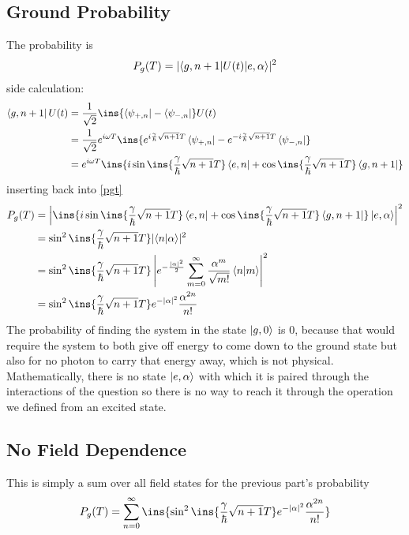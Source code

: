 \subsection{Ground Probability}
The probability is
\begin{equation}\label{pgt}
    P_g(T) = \lvert \braket{g,n+1\vert U(t)\vert e,\alpha} \rvert^2
\end{equation}
side calculation:
\begin{align}
    \bra{g,n+1}U(t) &= \frac{1}{\sqrt{2}}\ins{\bra{\psi_{+,n}}-\bra{\psi_{-,n}}}U(t)\\
    &= \frac{1}{\sqrt{2}}e^{i\omega T}\ins{e^{i\frac{\gamma}{\hbar}\sqrt{n+1}T}\bra{\psi_{+,n}}-e^{-i\frac{\gamma}{\hbar}\sqrt{n+1}T}\bra{\psi_{-,n}}}\\
    &= e^{i\omega T}\ins{i\sin\ins{\frac{\gamma}{\hbar}\sqrt{n+1}T}\bra{e,n}+\cos\ins{\frac{\gamma}{\hbar}\sqrt{n+1}T}\bra{g,n+1}}
\end{align}
inserting back into \autoref{pgt}
\begin{align}
    P_g(T) &= \left\lvert \ins{i\sin\ins{\frac{\gamma}{\hbar}\sqrt{n+1}T}\bra{e,n}+\cos\ins{\frac{\gamma}{\hbar}\sqrt{n+1}T}\bra{g,n+1}}\ket{e,\alpha} \right\rvert^2\\
    &= \sin^2\ins{\frac{\gamma}{\hbar}\sqrt{n+1}T}\lvert\braket{n\vert\alpha}\rvert^2\\
    &= \sin^2\ins{\frac{\gamma}{\hbar}\sqrt{n+1}T}\left\lvert e^{-\frac{\lvert\alpha\rvert^2}{2}}\sum\limits_{m=0}^\infty\frac{\alpha^m}{\sqrt{m!}}\braket{n\vert m}\right\rvert^2\\
    &= \sin^2\ins{\frac{\gamma}{\hbar}\sqrt{n+1}T}e^{-\lvert\alpha\rvert^2}\frac{\alpha^{2n}}{n!}
\end{align}
The probability of finding the system in the state $\ket{g,0}$ is 0, because that would require the system to both give off energy to come down to the ground state but also for no photon to carry that energy away, which is not physical. Mathematically, there is no state $\ket{e,\alpha}$ with which it is paired through the interactions of the question so there is no way to reach it through the operation we defined from an excited state.
\subsection{No Field Dependence}
This is simply a sum over all field states for the previous part's probability
\begin{equation}
    P_g(T) = \sum\limits_{n=0}^\infty \ins{\sin^2\ins{\frac{\gamma}{\hbar}\sqrt{n+1}T}e^{-\lvert\alpha\rvert^2}\frac{\alpha^{2n}}{n!}}
\end{equation}
